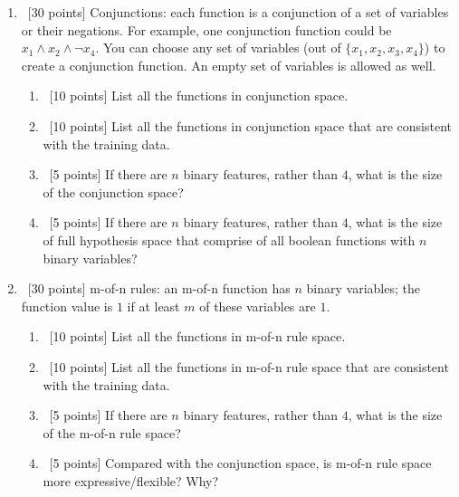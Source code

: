 \documentclass[12pt, fullpage,letterpaper]{article}
\begin{document}
\begin{enumerate}
\item~[30 points] Conjunctions: each function is a conjunction of a set of variables or their negations. For example, one conjunction function could be $x_1 \wedge  x_2 \wedge \neg x_4$. You can choose any set of variables (out of $\{x_1, x_2, x_3, x_4\}$) to create a conjunction function. An empty set of variables is allowed as well. 
\begin{enumerate}
	\item~[10 points] List all the functions in conjunction space. 
	\item~[10 points] List all the functions in conjunction space that are consistent with the training data. 
	\item~[5 points] If there are $n$ binary features, rather than $4$, what is the size of the conjunction  space? 
	\item~[5 points] If there are $n$ binary features, rather than $4$, what is the size of full hypothesis space that comprise of all  boolean functions with $n$ binary variables? 
\end{enumerate}

\item~[30 points] m-of-n rules: an m-of-n function has $n$ binary variables; the function value is $1$ if at least $m$ of these variables are $1$. 
\begin{enumerate}
	\item~[10 points] List all the functions in m-of-n rule space. 
	\item~[10 points] List all the functions in m-of-n rule space that are consistent with the training data. 
	\item~[5 points] If there are $n$ binary features, rather than $4$, what is the size of the m-of-n rule space? 
	\item~[5 points] Compared with the conjunction space, is m-of-n rule space more expressive/flexible? Why?
\end{enumerate}
\end{enumerate}
\end{document}
